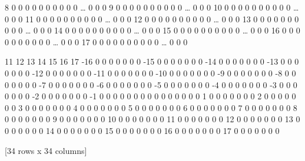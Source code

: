 \documentclass[letterpaper,10pt,english]{sphinxmanual}
\begin{document}
{\begin{sphinxVerbatim}[commandchars=\\\{\}]
 8     0    0    0    0    0    0    0    0    0    0  {\ldots}    0    0    0
 9     0    0    0    0    0    0    0    0    0    0  {\ldots}    0    0    0
 10    0    0    0    0    0    0    0    0    0    0  {\ldots}    0    0    0
 11    0    0    0    0    0    0    0    0    0    0  {\ldots}    0    0    0
 12    0    0    0    0    0    0    0    0    0    0  {\ldots}    0    0    0
 13    0    0    0    0    0    0    0    0    0    0  {\ldots}    0    0    0
 14    0    0    0    0    0    0    0    0    0    0  {\ldots}    0    0    0
 15    0    0    0    0    0    0    0    0    0    0  {\ldots}    0    0    0
 16    0    0    0    0    0    0    0    0    0    0  {\ldots}    0    0    0
 17    0    0    0    0    0    0    0    0    0    0  {\ldots}    0    0    0

      11   12   13   14   15   16   17
-16    0    0    0    0    0    0    0
-15    0    0    0    0    0    0    0
-14    0    0    0    0    0    0    0
-13    0    0    0    0    0    0    0
-12    0    0    0    0    0    0    0
-11    0    0    0    0    0    0    0
-10    0    0    0    0    0    0    0
-9     0    0    0    0    0    0    0
-8     0    0    0    0    0    0    0
-7     0    0    0    0    0    0    0
-6     0    0    0    0    0    0    0
-5     0    0    0    0    0    0    0
-4     0    0    0    0    0    0    0
-3     0    0    0    0    0    0    0
-2     0    0    0    0    0    0    0
-1     0    0    0    0    0    0    0
 0     0    0    0    0    0    0    0
 1     0    0    0    0    0    0    0
 2     0    0    0    0    0    0    0
 3     0    0    0    0    0    0    0
 4     0    0    0    0    0    0    0
 5     0    0    0    0    0    0    0
 6     0    0    0    0    0    0    0
 7     0    0    0    0    0    0    0
 8     0    0    0    0    0    0    0
 9     0    0    0    0    0    0    0
 10    0    0    0    0    0    0    0
 11    0    0    0    0    0    0    0
 12    0    0    0    0    0    0    0
 13    0    0    0    0    0    0    0
 14    0    0    0    0    0    0    0
 15    0    0    0    0    0    0    0
 16    0    0    0    0    0    0    0
 17    0    0    0    0    0    0    0

[34 rows x 34 columns]
\end{sphinxVerbatim}
}
\end{document}
